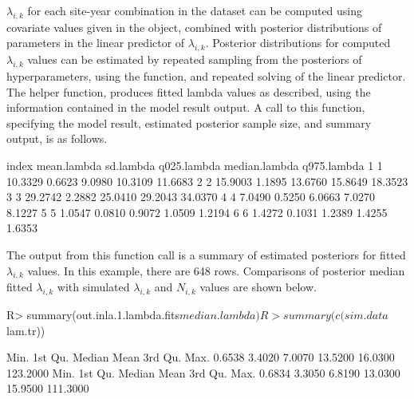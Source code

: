\documentclass[codesnippet]{jss}
\begin{document}
$\lambda_{i,k}$ for each site-year combination in the dataset can be computed using covariate values given in the  object, combined with posterior distributions of parameters in the linear predictor of $\lambda_{i,k}$. Posterior distributions for computed $\lambda_{i,k}$ values can be estimated by repeated sampling from the posteriors of hyperparameters, using the  function, and repeated solving of the linear predictor. The helper function,  produces fitted lambda values as described, using the information contained in the model result output. A call to this function, specifying the model result, estimated posterior sample size, and summary output, is as follows.

\begin{CodeOutput}
  index mean.lambda sd.lambda  q025.lambda  median.lambda   q975.lambda
1     1     10.3329    0.6623       9.0980        10.3109       11.6683
2     2     15.9003    1.1895      13.6760        15.8649       18.3523
3     3     29.2742    2.2882      25.0410        29.2043       34.0370
4     4      7.0490    0.5250       6.0663         7.0270        8.1227
5     5      1.0547    0.0810       0.9072         1.0509        1.2194
6     6      1.4272    0.1031       1.2389         1.4255        1.6353
\end{CodeOutput}

The output from this function call is a summary of estimated posteriors for fitted $\lambda_{i,k}$ values. In this example, there are 648 rows. Comparisons of posterior median fitted $\lambda_{i,k}$ with simulated $\lambda_{i,k}$ and $N_{i,k}$ values are shown below.

\begin{CodeInput}
R> summary(out.inla.1.lambda.fits$median.lambda)
R> summary(c(sim.data$lam.tr))
\end{CodeInput}
\begin{CodeOutput}
  Min.   1st Qu.    Median     Mean    3rd Qu.       Max. 
0.6538    3.4020    7.0070  13.5200    16.0300   123.2000
  Min.   1st Qu.    Median     Mean    3rd Qu.       Max. 
0.6834    3.3050    6.8190  13.0300    15.9500   111.3000 
\end{CodeOutput}
\end{document}

